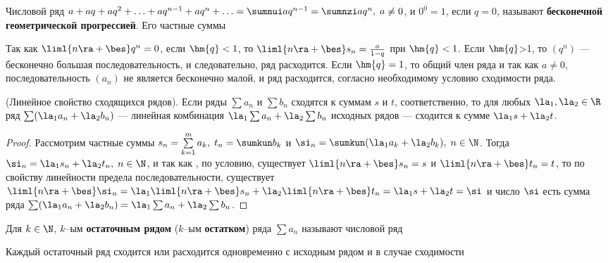 \documentclass[a4paper]{article}
\begin{document}
Числовой ряд $a+aq+aq^2+\ldots+aq^{n-1} + aq^n + \ldots = \sumnui
aq^{n-1} = \sumnzi aq^n, \; a\ne0$, и $0^0=1$, если $q=0$, называют
\textbf{бесконечной геометрической прогрессией}. Его частные суммы

Так как $\liml{n\ra+\bes}q^n=0$, если $\hm{q}<1$, то
$\liml{n\ra+\bes} s_n = \frac{a}{1-q}$ при $\hm{q}<1$. Если
$\hm{q}$>1, то $(q^n)$ --- бесконечно большая последовательность, и
следовательно, ряд расходится. Если $\hm{q}=1$, то общий член ряда
 и так как $a\ne0$, последовательность $(a_n)$ не является
бесконечно малой, и ряд расходится, согласно необходимому условию
сходимости ряда.

\begin{theorem}
(Линейное свойство сходящихся рядов). Если ряды $\sum a_n$ и $\sum
b_n$ сходятся к суммам $s$ и $t$, соответственно, то для любых
$\la_1,\la_2\in\R$ ряд $\sum(\la_1a_n+\la_2b_n)$ --- линейная
комбинация $\la_1\sum a_n+\la_2\sum b_n$ исходных рядов --- сходится
к сумме $\la_1s+\la_2t$.
\end{theorem}

\begin{proof}
Рассмотрим частные суммы $s_n=\sum\limits_{k=1}^m a_k, \;
t_n=\sumkun b_k$ и $\si_n = \sumkun (\la_1a_k+\la_2b_k), \; n\in\N$.
Тогда $\si_n=\la_1s_n+\la_2t_n, \; n\in\N$, и так как , по условию,
существует $\liml{n\ra+\bes}s_n=s$ и $\liml{n\ra+\bes}t_n=t$, то по
свойству линейности предела последовательности, существует
$\liml{n\ra+\bes}\si_n = \la_1\liml{n\ra+\bes}s_n +
\la_2\liml{n\ra+\bes}t_n=\la_1s+\la_2t=\si$ и число $\si$ есть сумма
ряда $\sum (\la_1a_n+\la_2b_n) = \la_1\sum a_n + \la_2 \sum b_n$.
\end{proof}

Для $k\in\N$, $k$--ым \textbf{остаточным рядом} ($k$--ым
\textbf{остатком}) ряда $\sum a_n$ называют числовой ряд

\begin{theorem}
Каждый остаточный ряд сходится или расходится одновременно с
исходным рядом и в случае сходимости 
\end{theorem}
\end{document}
